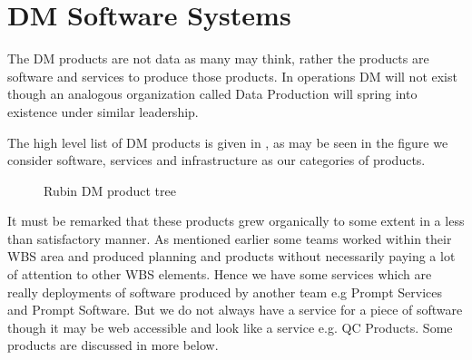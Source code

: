 \section {DM Software Systems} \label{sec:softproducts}
The DM products are not data as many may think, rather the products are software and services to produce those
products.
In operations DM will not exist though an analogous organization called Data Production will spring into existence under similar leadership.

The high level list of DM products is given in , as may be seen in the  figure we consider software, services and infrastructure as our categories of products.


\begin{figure}
\caption{Rubin DM product tree \label{fig:pt}}
\end{figure}

It must be remarked that these products grew organically to some extent in a less than satisfactory manner.
As mentioned earlier some teams worked within their WBS area and produced planning and products without necessarily paying a lot of attention to other WBS elements. Hence we have some services which are really deployments of software produced by another team e.g Prompt Services and Prompt Software. But we do not always have a service for a piece of software though it may be web accessible and look like a service e.g. QC Products.
Some products are discussed in more below.








